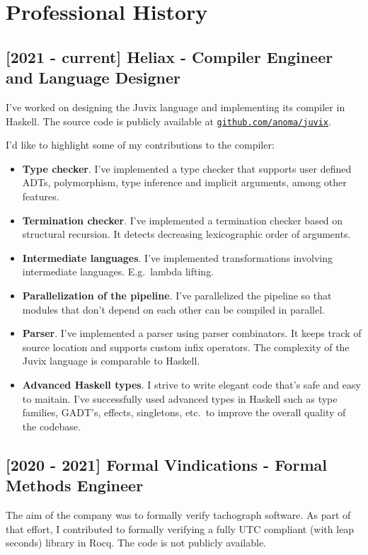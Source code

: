 \documentclass[11pt]{article}
\begin{document}
\section{Professional History}

\subsection*{[2021 - current] Heliax - Compiler Engineer and Language Designer}
I've worked on designing the Juvix language and implementing its compiler in Haskell.
The source code is publicly available at \href{https://github.com/anoma/juvix}{\texttt{github.com/anoma/juvix}}.

I'd like to highlight some of my contributions to the compiler:
\begin{itemize}
  \item \textbf{Type checker}. I've implemented a type checker that supports
        user defined ADTs, polymorphism, type inference and implicit arguments,
        among other features.
  \item \textbf{Termination checker}. I've implemented a termination checker based on
        structural recursion. It detects decreasing lexicographic order of
        arguments.
  \item \textbf{Intermediate languages}. I've implemented transformations
        involving intermediate languages. E.g.\ lambda lifting.
  \item \textbf{Parallelization of the pipeline}. I've parallelized the pipeline so that
        modules that don't depend on each other can be compiled in parallel.
  \item \textbf{Parser}. I've implemented a parser using parser combinators. It keeps track of source location and supports custom infix operators. The complexity of the Juvix language is comparable to Haskell.
  \item \textbf{Advanced Haskell types}. I strive to write elegant code that's
        safe and easy to maitain. I've successfully used advanced types in
        Haskell such as type families, GADT's, effects, singletons, etc.\ to
        improve the overall quality of the codebase.
\end{itemize}

\subsection*{[2020 - 2021] Formal Vindications - Formal Methods Engineer}
The aim of the company was to formally verify tachograph software. As part of
that effort, I contributed to formally verifying a fully UTC compliant (with
leap seconds) library in Rocq. The code is not publicly available.
\end{document}
